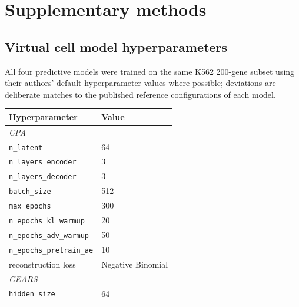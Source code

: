 \documentclass{article}
\theoremstyle{plain}
\theoremstyle{definition}
\theoremstyle{remark}
\begin{document}
\section{Supplementary methods}
\label{app:supp_methods}

\subsection{Virtual cell model hyperparameters}
\label{app:hparams}

All four predictive models were trained on the same K562 200-gene subset using their authors' default hyperparameter values where possible; deviations are deliberate matches to the published reference configurations of each model.

\begin{table}[h]
\centering
\small
\begin{tabular}{ll}
\toprule
\textbf{Hyperparameter} & \textbf{Value} \\
\midrule
\multicolumn{2}{l}{\textit{CPA}~\citep{lotfollahi2023cpa}} \\
\hspace{1em}\texttt{n\_latent}                            & 64 \\
\hspace{1em}\texttt{n\_layers\_encoder}                   & 3 \\
\hspace{1em}\texttt{n\_layers\_decoder}                   & 3 \\
\hspace{1em}\texttt{batch\_size}                          & 512 \\
\hspace{1em}\texttt{max\_epochs}                          & 300 \\
\hspace{1em}\texttt{n\_epochs\_kl\_warmup}                & 20 \\
\hspace{1em}\texttt{n\_epochs\_adv\_warmup}               & 50 \\
\hspace{1em}\texttt{n\_epochs\_pretrain\_ae}              & 10 \\
\hspace{1em}reconstruction loss                           & Negative Binomial \\
\midrule
\multicolumn{2}{l}{\textit{GEARS}~\citep{roohani2024gears}} \\
\hspace{1em}\texttt{hidden\_size}                          & 64 \\

\end{tabular}
\end{table}
\end{document}
